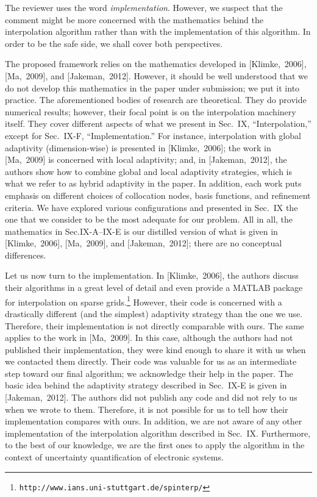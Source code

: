 \begin{authors}
The reviewer uses the word \emph{implementation}. However, we suspect that the
comment might be more concerned with the mathematics behind the interpolation
algorithm rather than with the implementation of this algorithm. In order to be
the safe side, we shall cover both perspectives.

The proposed framework relies on the mathematics developed in [Klimke,~2006],
[Ma,~2009], and [Jakeman,~2012]. However, it should be well understood that we
do not develop this mathematics in the paper under submission; we put it into
practice. The aforementioned bodies of research are theoretical. They do provide
numerical results; however, their focal point is on the interpolation machinery
itself. They cover different aspects of what we present in Sec.~IX,
``Interpolation,'' except for Sec.~IX-F, ``Implementation.'' For instance,
interpolation with global adaptivity (dimension-wise) is presented in
[Klimke,~2006]; the work in [Ma,~2009] is concerned with local adaptivity; and,
in [Jakeman,~2012], the authors show how to combine global and local adaptivity
strategies, which is what we refer to as hybrid adaptivity in the paper. In
addition, each work puts emphasis on different choices of collocation nodes,
basis functions, and refinement criteria. We have explored various
configurations and presented in Sec.~IX the one that we consider to be the most
adequate for our problem. All in all, the mathematics in Sec.IX-A--IX-E is our
distilled version of what is given in [Klimke,~2006], [Ma,~2009], and
[Jakeman,~2012]; there are no conceptual differences.

Let us now turn to the implementation. In [Klimke,~2006], the authors discuss
their algorithms in a great level of detail and even provide a MATLAB package
for interpolation on sparse
grids.\footnote{\texttt{http://www.ians.uni-stuttgart.de/spinterp/}} However,
their code is concerned with a drastically different (and the simplest)
adaptivity strategy than the one we use. Therefore, their implementation is not
directly comparable with ours. The same applies to the work in [Ma,~2009]. In
this case, although the authors had not published their implementation, they
were kind enough to share it with us when we contacted them directly. Their code
was valuable for us as an intermediate step toward our final algorithm; we
acknowledge their help in the paper. The basic idea behind the adaptivity
strategy described in Sec.~IX-E is given in [Jakeman,~2012]. The authors did not
publish any code and did not rely to us when we wrote to them. Therefore, it is
not possible for us to tell how their implementation compares with ours.
In addition, we are not aware of any other implementation of the interpolation
algorithm described in Sec.~IX. Furthermore, to the best of our knowledge, we
are the first ones to apply the algorithm in the context of uncertainty
quantification of electronic systems.


\end{authors}
